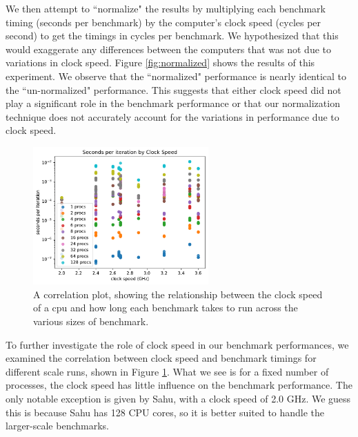 \documentclass{article}
\begin{document}
We then attempt to ``normalize" the results by multiplying each benchmark timing (seconds per benchmark) by the computer's clock speed (cycles per second) to get the timings in cycles per benchmark. We hypothesized that this would exaggerate any differences between the computers that was not due to variations in clock speed. Figure \ref{fig:normalized} shows the results of this experiment. We observe that the ``normalized" performance is nearly identical to the ``un-normalized" performance. This suggests that either clock speed did not play a significant role in the benchmark performance or that our normalization technique does not accurately account for the variations in performance due to clock speed.

\begin{figure}[h]
    \centering
    \includegraphics[width=0.6\textwidth]{figures/final/correlation.pdf}
    \caption{A correlation plot, showing the relationship between the clock speed of a cpu and how long each benchmark takes to run across the various sizes of benchmark. }
    \label{fig:correlation}
\end{figure}

To further investigate the role of clock speed in our benchmark performances, we examined the correlation between clock speed and benchmark timings for different scale runs, shown in Figure \ref{fig:correlation}. What we see is for a fixed number of processes, the clock speed has little influence on the benchmark performance. The only notable exception is given by Sahu, with a clock speed of 2.0 GHz. We guess this is because Sahu has 128 CPU cores, so it is better suited to handle the larger-scale benchmarks.
\end{document}
